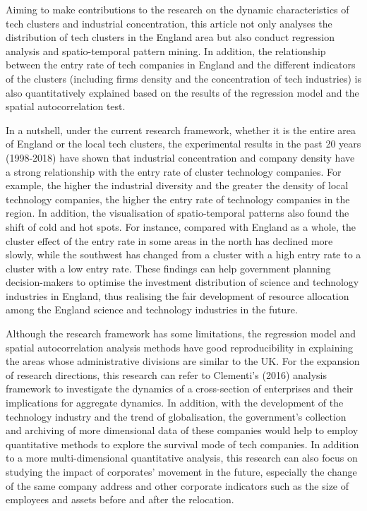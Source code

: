 \documentclass[
  12pt,
  oneside]{book}
\begin{document}
Aiming to make contributions to the research on the dynamic characteristics of tech clusters and industrial concentration, this article not only analyses the distribution of tech clusters in the England area but also conduct regression analysis and spatio-temporal pattern mining. In addition, the relationship between the entry rate of tech companies in England and the different indicators of the clusters (including firms density and the concentration of tech industries) is also quantitatively explained based on the results of the regression model and the spatial autocorrelation test.

In a nutshell, under the current research framework, whether it is the entire area of England or the local tech clusters, the experimental results in the past 20 years (1998-2018) have shown that industrial concentration and company density have a strong relationship with the entry rate of cluster technology companies. For example, the higher the industrial diversity and the greater the density of local technology companies, the higher the entry rate of technology companies in the region. In addition, the visualisation of spatio-temporal patterns also found the shift of cold and hot spots. For instance, compared with England as a whole, the cluster effect of the entry rate in some areas in the north has declined more slowly, while the southwest has changed from a cluster with a high entry rate to a cluster with a low entry rate. These findings can help government planning decision-makers to optimise the investment distribution of science and technology industries in England, thus realising the fair development of resource allocation among the England science and technology industries in the future.

Although the research framework has some limitations, the regression model and spatial autocorrelation analysis methods have good reproducibility in explaining the areas whose administrative divisions are similar to the UK. For the expansion of research directions, this research can refer to Clementi's (2016) analysis framework to investigate the dynamics of a cross-section of enterprises and their implications for aggregate dynamics. In addition, with the development of the technology industry and the trend of globalisation, the government's collection and archiving of more dimensional data of these companies would help to employ quantitative methods to explore the survival mode of tech companies. In addition to a more multi-dimensional quantitative analysis, this research can also focus on studying the impact of corporates' movement in the future, especially the change of the same company address and other corporate indicators such as the size of employees and assets before and after the relocation.
\end{document}
